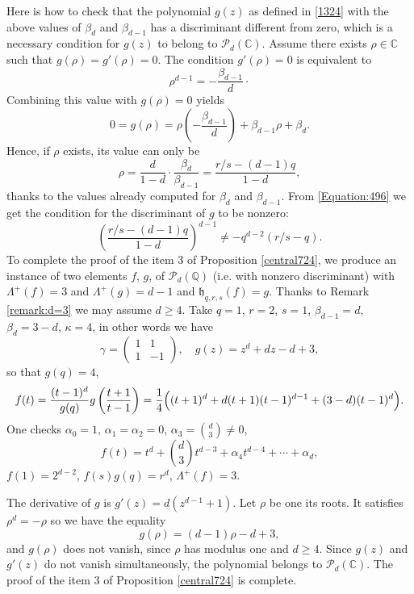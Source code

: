 \documentclass[10pt]{article}
\theoremstyle{definition}
\numberwithin{equation}{section}
\newcommand {\Q}{{\mathbb{Q}}}
\newcommand {\C}{{\mathbb{C}}}
\begin{document}
 
 Here is how to check that the polynomial $g(z)$ as defined in \eqref{1324} with the above values of $\beta_d$ and $\beta_{d-1}$ has a discriminant different from zero, which is a necessary condition for $g(z)$ to belong to $\mathcal P_d (\C)$. Assume there exists $\rho \in \C$ such that $g(\rho) = g' (\rho) =0$. The condition $g'(\rho) =0$ is equivalent to 
 \begin{equation}\label{Equation:496}
\rho^{d-1} = - \frac{\beta_{d-1}}{d}\cdotp
\end{equation}
Combining this value with $g(\rho) =0$ yields
\[
0 = g(\rho) = \rho \left( - \frac {\beta_{d-1}} d\right) + \beta_{d-1} \rho + \beta_d.
\]
Hence, if $\rho$ exists, its value can only be 
\[
\rho = \frac d{1-d}\cdot \frac{\beta_d}{\beta_{d-1}}= \frac{r/s-(d-1)q}{1-d},
\]
thanks to the values already computed for $\beta_d$ and $\beta_{d-1}$. From \eqref{Equation:496} we get the condition for the discriminant of $g$ to be nonzero:
\[
\left( \frac{r/s -(d-1) q}{1-d}\right)^{d-1} \neq -q^{d-2} (r/s-q).
\]
 To complete the proof of the item 3 of Proposition \ref{central724}, we produce an instance of two elements $f$, $g$, of $\mathcal P_d(\Q)$ (i.e. with nonzero discriminant) with $\Lambda^+(f)=3$ and $\Lambda^+(g)=d-1$ and $\mathfrak h_{q,r,s} (f) = g$. Thanks to Remark \ref{remark:d=3} we may assume $d\geqslant 4$. 
Take 
$q=1$, $r=2$, $s=1$, $\beta_{d-1}=d$, $\beta_d=3-d$, $\kappa=4$, in other words we have
\[
\gamma=\begin{pmatrix} 1&1\\1&-1\end{pmatrix}, \quad g(z)=z^d+dz-d+3,
\]
so that $g(q)=4$, 
\begin{equation}\label{1336}
f(t)=\frac{(t-1)^d}{g(q)} g\left(\frac {t+1}{t-1}\right)=\frac 1 4 \Bigl(
(t+1)^d +d(t+1)(t-1)^{d-1}+(3-d)(t-1)^d\Bigr).
\end{equation}
One checks $\alpha_0=1$, $\alpha_1=\alpha_2=0$, $\alpha_3=\displaystyle \binom d 3 \not=0$, 
\[
f(t) = t^d+ \binom{d}{3} t^{d-3} + \alpha_4t^{d-4}+ \cdots+\alpha_d,
\]
$f(1)=2^{d-2}$, $f(s)g(q)=r^d$, $\Lambda^+(f)=3$. 

The derivative of $g$ is $g'(z)=d(z^{d-1}+1)$. Let $\rho$ be one its roots. It satisfies $\rho^d =-\rho$ so we have the equality
\[
g(\rho) = (d-1) \rho -d+3,
\] 
and $g(\rho)$ does not vanish, since $\rho$ has modulus one and $d\geqslant 4$. Since $g(z)$ and $g'(z)$ do not vanish simultaneously,
the polynomial belongs to $\mathcal P_d (\C)$. The proof of the item 3 of Proposition \ref{central724} is complete.
\end{document}
